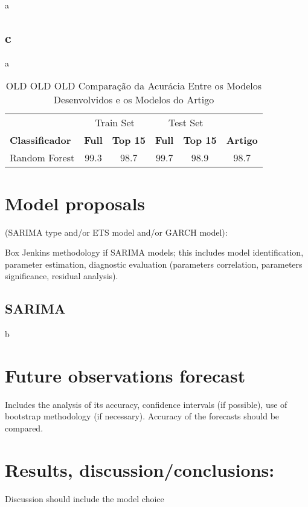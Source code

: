 \documentclass[journal]{IEEEtran}
\begin{document}
a

\subsection{c}

a

\begin{table}[H]
\centering
\caption{OLD OLD OLD Comparação da Acurácia Entre os Modelos Desenvolvidos e os Modelos do Artigo}
\label{accuracies}
\begin{tabular}{l|cc|cc|c}
\toprule
 & \multicolumn{2}{c|}{Train Set} & \multicolumn{2}{c|}{Test Set} & \\
\textbf{Classificador} & \textbf{Full} & \textbf{Top 15} & \textbf{Full} & \textbf{Top 15} & \textbf{Artigo} \\
\midrule
Random Forest & 99.3 & 98.7 & 99.7 & 98.9 & 98.7 \\
\bottomrule
\end{tabular}
\end{table}

\section{ Model proposals}

 (SARIMA type and/or ETS model and/or GARCH model):

Box  Jenkins methodology if SARIMA models; this includes model identification,
parameter estimation, diagnostic evaluation (parameters correlation,
parameters significance, residual analysis).

\subsection{SARIMA}

b

\section{Future observations forecast}

Includes the analysis of its accuracy, confidence intervals (if possible), use of
bootstrap methodology (if necessary). Accuracy of the forecasts should be
compared.

\section{Results, discussion/conclusions:}

Discussion should include the model choice
\end{document}
